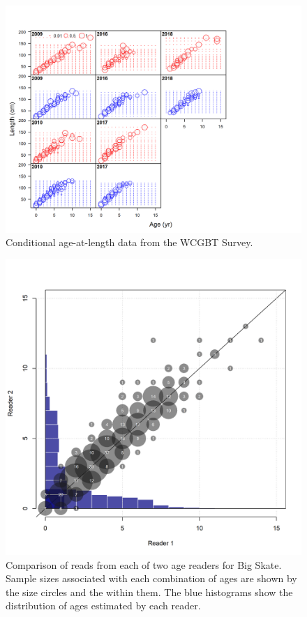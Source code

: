 \documentclass[12pt,]{article}
\begin{document}
\begin{figure}
\centering
\includegraphics{r4ss/plots_mod1/comp_condAALdat_bubflt5mkt0.png}
\caption{Conditional age-at-length data from the WCGBT Survey.
\label{fig:age_dat_fishery}}
\end{figure}

\begin{figure}
\centering
\includegraphics{Figures/Reader_1_vs_Reader_2.png}
\caption{Comparison of reads from each of two age readers for Big Skate.
Sample sizes associated with each combination of ages are shown by the
size circles and the within them. The blue histograms show the
distribution of ages estimated by each
reader.\label{fig:ageing_comparison}}
\end{figure}
\end{document}
